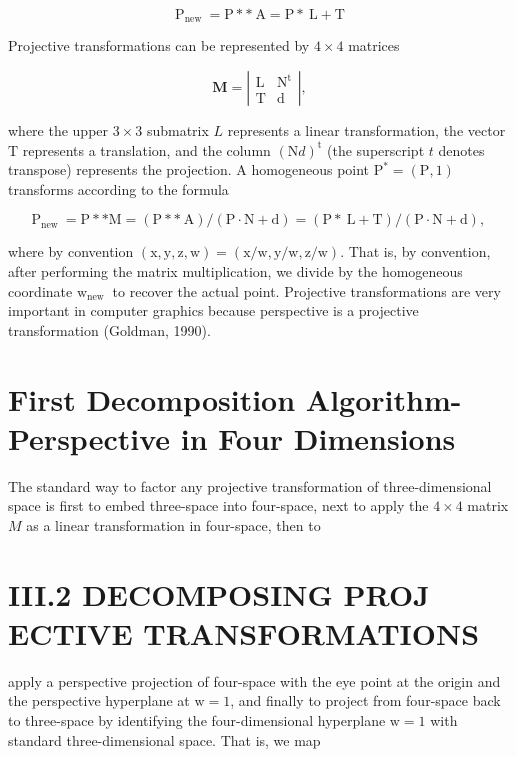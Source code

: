 $$
\mathrm{P}_{\text {new }}=\mathrm{P} * * \mathrm{~A}=\mathrm{P} * \mathrm{~L}+\mathrm{T}
$$

Projective transformations can be represented by $4 \times 4$ matrices

$$
\mathbf{M}=\left|\begin{array}{cc}
\mathrm{L} & \mathrm{N}^{\mathrm{t}} \\
\mathrm{T} & \mathrm{d}
\end{array}\right|,
$$

where the upper $3 \times 3$ submatrix $L$ represents a linear transformation, the vector $\mathrm{T}$ represents a translation, and the column $(\mathrm{N} d)^{\mathrm{t}}$ (the superscript $t$ denotes transpose) represents the projection. A homogeneous point $\mathrm{P}^{*}=(\mathrm{P}, 1)$ transforms according to the formula

$$
\mathrm{P}_{\text {new }}=\mathrm{P} * * \mathrm{M}=(\mathrm{P} * * \mathrm{~A}) /(\mathrm{P} \cdot \mathrm{N}+\mathrm{d})=(\mathrm{P} * \mathrm{~L}+\mathrm{T}) /(\mathrm{P} \cdot \mathrm{N}+\mathrm{d}) \text {, }
$$

where by convention $(\mathrm{x}, \mathrm{y}, \mathrm{z}, \mathrm{w})=(\mathrm{x} / \mathrm{w}, \mathrm{y} / \mathrm{w}, \mathrm{z} / \mathrm{w})$. That is, by convention, after performing the matrix multiplication, we divide by the homogeneous coordinate $\mathrm{w}_{\text {new }}$ to recover the actual point. Projective transformations are very important in computer graphics because perspective is a projective transformation (Goldman, 1990).

\section{First Decomposition Algorithm-Perspective in Four Dimensions}
The standard way to factor any projective transformation of three-dimensional space is first to embed three-space into four-space, next to apply the $4 \times 4$ matrix $M$ as a linear transformation in four-space, then to

\section{III.2 DECOMPOSING PROJ ECTIVE TRANSFORMATIONS}
apply a perspective projection of four-space with the eye point at the origin and the perspective hyperplane at $\mathrm{w}=1$, and finally to project from four-space back to three-space by identifying the four-dimensional hyperplane $\mathrm{w}=1$ with standard three-dimensional space. That is, we map

